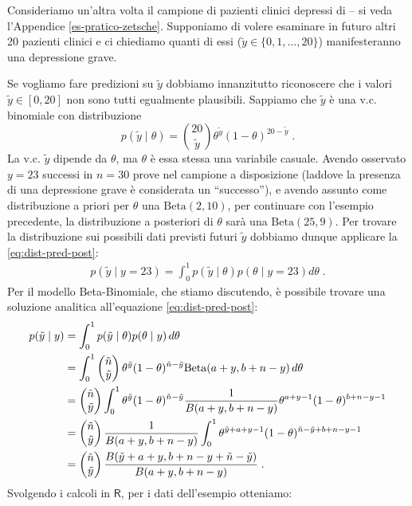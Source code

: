 \documentclass[
  10pt,
  italian,
  a4paper,
  extrafontsizes,onecolumn,openright
  ]{memoir}
\newcommand{\R}{\textsf{R}} %
\begin{document}
Consideriamo un'altra volta il campione di pazienti clinici depressi di \textcite{zetschefuture2019} -- si veda l'Appendice \ref{es-pratico-zetsche}. Supponiamo di volere esaminare in futuro altri 20 pazienti clinici e ci chiediamo quanti di essi (\(\tilde{y} \in \{0, 1, \dots, 20\}\)) manifesteranno una depressione grave.

Se vogliamo fare predizioni su \(\tilde{y}\) dobbiamo innanzitutto riconoscere che i valori \(\tilde{y} \in [0, 20]\) non sono tutti egualmente plausibili. Sappiamo che \(\tilde{y}\) è una v.c. binomiale con distribuzione
\begin{equation}
p(\tilde{y}\mid \theta) = \binom{20}{\tilde{y}} \theta^{\tilde{y}}(1-\theta)^{20 - \tilde{y}} \; .
\label{eq:post-yprime}
\end{equation}
La v.c. \(\tilde{y}\) dipende da \(\theta\), ma \(\theta\) è essa stessa una variabile casuale. Avendo osservato \(y = 23\) successi in \(n = 30\) prove nel campione a disposizione (laddove la presenza di una depressione grave è considerata un ``successo''), e avendo assunto come distribuzione a priori per \(\theta\) una \(\mbox{Beta}(2, 10)\), per continuare con l'esempio precedente, la distribuzione a posteriori di \(\theta\) sarà una \(\mbox{Beta}(25, 9)\). Per trovare la distribuzione sui possibili dati previsti futuri \(\tilde{y}\) dobbiamo dunque applicare la \eqref{eq:dist-pred-post}:
\begin{align}
p(\tilde{y} \mid y = 23) = \int_0^1 p(\tilde{y} \mid \theta) p(\theta \mid y = 23) d\theta \; .
\label{eq:post-yprime-y17}
\end{align}
Per il modello Beta-Binomiale, che stiamo discutendo, è possibile trovare una soluzione analitica all'equazione \eqref{eq:dist-pred-post}:
\begin{align}
p(\tilde{y} \mid y) &= \int_0^1 p(\tilde{y} \mid \theta)
p(\theta \mid y)\, d\theta \notag\\
 &= \int_0^1 \begin{pmatrix}\tilde{n}\\\tilde{y}\end{pmatrix}
 \theta^{\tilde{y}}
(1-\theta)^{\tilde{n}-\tilde{y}} \mbox{Beta}(a+y,b+n-y) \, d\theta \notag\\
&= \begin{pmatrix}{\tilde{n}}\\\tilde{y}\end{pmatrix} \int_0^1 \theta^{\tilde{y}}
(1-\theta)^{\tilde{n}-\tilde{y}} \frac{1}{B(a+y, b+n-y)}\theta^{a+y-1}(1-\theta)^{b+n-y-1}\notag\\
&= \begin{pmatrix}{\tilde{n}}\\\tilde{y}\end{pmatrix} \frac{1}{B(a+y, b+n-y)}\int_0^1 \theta^{\tilde{y}+a+y-1}(1-\theta)^{\tilde{n}-\tilde{y}+b+n-y-1}\notag\\
&= \begin{pmatrix}{\tilde{n}}\\\tilde{y}\end{pmatrix} \frac{B(\tilde{y}+a+y,b+n-y+\tilde{n}-\tilde{y})}{B(a+y, b+n-y)} \; .
\label{eq:post-yprime-an-sol-betabin}
\end{align}
Svolgendo i calcoli in \(\R\), per i dati dell'esempio otteniamo:
\end{document}
